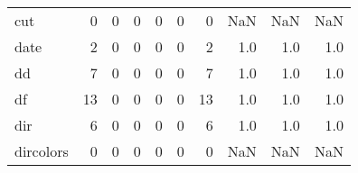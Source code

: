 \begin{tabular}{lrrrrrrrrr}
cut       &                                       0 &                                                  0 &                                                  0 &                                                  0 &                                                  0 &                                                  0 &                                                NaN &                                    NaN &                                  NaN \\
date      &                                       2 &                                                  0 &                                                  0 &                                                  0 &                                                  0 &                                                  2 &                                                1.0 &                                    1.0 &                                  1.0 \\
dd        &                                       7 &                                                  0 &                                                  0 &                                                  0 &                                                  0 &                                                  7 &                                                1.0 &                                    1.0 &                                  1.0 \\
df        &                                      13 &                                                  0 &                                                  0 &                                                  0 &                                                  0 &                                                 13 &                                                1.0 &                                    1.0 &                                  1.0 \\
dir       &                                       6 &                                                  0 &                                                  0 &                                                  0 &                                                  0 &                                                  6 &                                                1.0 &                                    1.0 &                                  1.0 \\
dircolors &                                       0 &                                                  0 &                                                  0 &                                                  0 &                                                  0 &                                                  0 &                                                NaN &                                    NaN &                                  NaN \\

\end{tabular}
